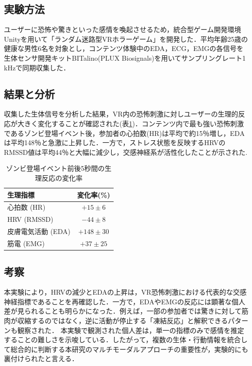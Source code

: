 \documentclass[paper=a4paper,fontsize=10pt,jafontscale=0.925,twocolumn]{jlreq}
\begin{document}
\subsection{実験方法}
ユーザーに恐怖や驚きといった感情を喚起させるため，統合型ゲーム開発環境Unityを用いて「ランダム迷路型VRホラーゲーム」を開発した．平均年齢25歳の健康な男性6名を対象とし，コンテンツ体験中のEDA，ECG，EMGの各信号を生体センサ開発キットBITalino(PLUX Biosignals)を用いてサンプリングレート1 kHzで同期収集した．

\subsection{結果と分析}
収集した生体信号を分析した結果，VR内の恐怖刺激に対しユーザーの生理的反応が大きく変化することが確認された(表\ref{table:zombie_event})．コンテンツ内で最も強い恐怖刺激であるゾンビ登場イベント後，参加者の心拍数(HR)は平均で約15％増し，EDAは平均148％と急激に上昇した．一方で，ストレス状態を反映するHRVのRMSSD値\cite{TaskForce1996}は平均44％と大幅に減少し，交感神経系が活性化したことが示された.

\begin{table}[tp]
 \centering
 \caption{ゾンビ登場イベント前後5秒間の生理反応の変化率}
 \begin{tabular}{l|c} \hline
  生理指標 & 変化率(\%) \\ \hline
  心拍数 (HR) & $+15 \pm 6$ \\
  HRV (RMSSD) & $-44 \pm 8$ \\
  皮膚電気活動 (EDA) & $+148 \pm 30$ \\
  筋電 (EMG) & $+37 \pm 25$ \\ \hline
 \end{tabular}
 \label{table:zombie_event}
\end{table}

\subsection{考察}
本実験により，HRVの減少とEDAの上昇は，VR恐怖刺激における代表的な交感神経指標であることを再確認した．一方で，EDAやEMGの反応には顕著な個人差が見られることも明らかになった．例えば，一部の参加者では驚きに対して筋肉が収縮するのではなく，逆に活動が停止する「凍結反応」と解釈できるパターンも観察された．
本実験で観測された個人差は，単一の指標のみで感情を推定することの難しさを示唆している．したがって，複数の生体・行動情報を統合して総合的に判断する本研究のマルチモーダルアプローチの重要性が，実験的にも裏付けられたと言える．
\end{document}
